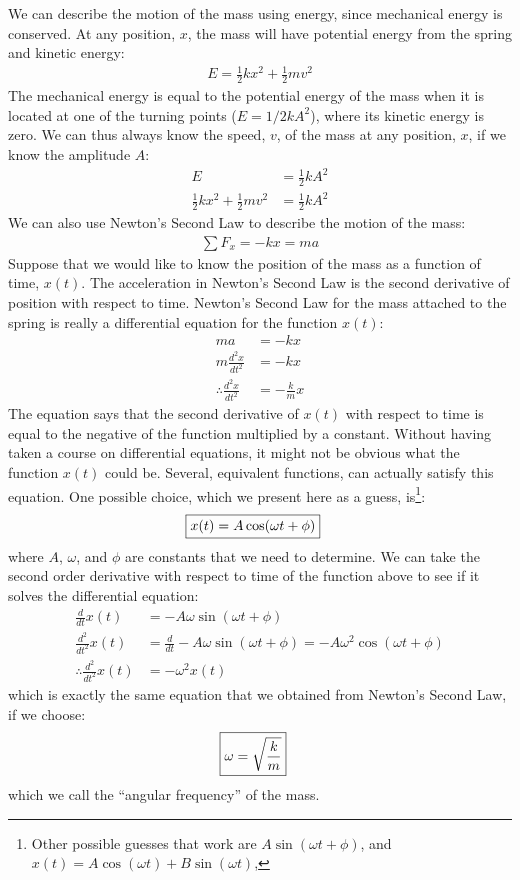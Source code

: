 We can describe the motion of the mass using energy, since mechanical energy is conserved. At any position, $x$, the mass will have potential energy from the spring and kinetic energy:
\begin{align*}
E = \frac{1}{2}kx^2 + \frac{1}{2}mv^2
\end{align*}
The mechanical energy is equal to the potential energy of the mass when it is located at one of the turning points ($E=1/2kA^2$), where its kinetic energy is zero. We can thus always know the speed, $v$, of the mass at any position, $x$, if we know the amplitude $A$:
\begin{align*}
E &= \frac{1}{2}kA^2\\
\frac{1}{2}kx^2 + \frac{1}{2}mv^2&= \frac{1}{2}kA^2
\end{align*}
We can also use Newton's Second Law to describe the motion of the mass:
\begin{align*}
\sum F_x = -kx = ma
\end{align*}
Suppose that we would like to know the position of the mass as a function of time, $x(t)$. The acceleration in Newton's Second Law is the second derivative of position with respect to time. Newton's Second Law for the mass attached to the spring is really a differential equation for the function $x(t)$:
\begin{align*}
ma &= -kx\\
m\frac{d^2x}{dt^2} &= -kx\\
\therefore \frac{d^2x}{dt^2} &= -\frac{k}{m}x
\end{align*}
The equation says that the second derivative of $x(t)$ with respect to time is equal to the negative of the function multiplied by a constant. Without having taken a course on differential equations, it might not be obvious what the function $x(t)$ could be. Several, equivalent functions, can actually satisfy this equation. One possible choice, which we present here as a guess, is\footnote{Other possible guesses that work are $A \sin(\omega t + \phi)$, and $x(t) = A\cos(\omega t) + B\sin(\omega t)$,}:
\begin{align}
\Aboxed{x(t) = A \cos(\omega t + \phi)}
\end{align}
where $A$, $\omega$, and $\phi$ are constants that we need to determine. We can take the second order derivative with respect to time of the function above to see if it solves the differential equation:
\begin{align*}
\frac{d}{dt}x(t) &= -A\omega\sin(\omega t + \phi)\\
\frac{d^2}{dt^2}x(t) &=\frac{d}{dt}-A\omega\sin(\omega t + \phi) = -A\omega^2\cos(\omega t + \phi)\\
\therefore \frac{d^2}{dt^2}x(t) &= - \omega^2 x(t)
\end{align*}
which is exactly the same equation that we obtained from Newton's Second Law, if we choose:
\begin{align}
\Aboxed{\omega = \sqrt{\frac{k}{m}}}
\end{align}
which we call the ``angular frequency'' of the mass. 

